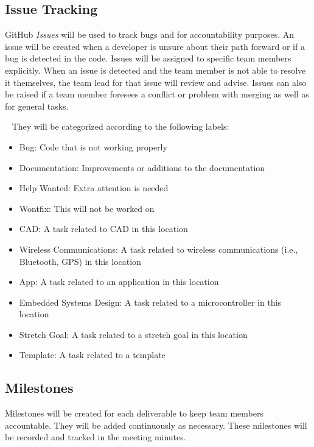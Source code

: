 \documentclass{article}
\begin{document}
\subsection{Issue Tracking}

GitHub \emph{Issues} will be used to track bugs and for accountability purposes. An issue will be created when a developer is unsure about their path forward or if a bug is detected in the code. Issues will be assigned to specific team members explicitly. When an issue is detected and the team member is not able to resolve it themselves, the team lead for that issue will review and advise. Issues can also be raised if a team member foresees a conflict or problem with merging as well as for general tasks. 

~\newline
They will be categorized according to the following labels:

\begin{itemize}

\item Bug: Code that is not working properly
\item Documentation: Improvements or additions to the documentation
\item Help Wanted: Extra attention is needed
\item Wontfix: This will not be worked on
\item CAD: A task related to CAD in this location
\item Wireless Communications: A task related to wireless communications (i.e., Bluetooth, GPS) in this location
\item App: A task related to an application in this location
\item Embedded Systems Design: A task related to a microcontroller in this location
\item Stretch Goal: A task related to a stretch goal in this location
\item Template: A task related to a template
\end{itemize}

\subsection{Milestones}

Milestones will be created for each deliverable to keep team members accountable.  They will be added continuously as necessary. These milestones will be recorded and tracked in the meeting minutes.
\end{document}
